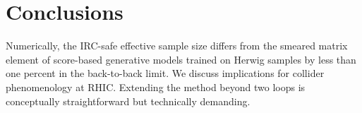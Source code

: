 \section{Conclusions}\label{sec:conclusions}

Numerically, the IRC-safe effective sample size differs from the smeared
matrix element of score-based generative models trained on Herwig
samples by less than one percent in the back-to-back limit. We discuss
implications for collider phenomenology at RHIC. Extending the method
beyond two loops is conceptually straightforward but technically
demanding.

